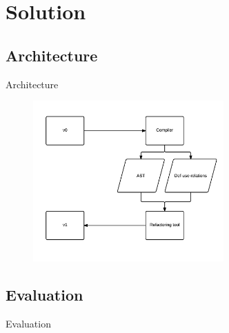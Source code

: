 \documentclass[xcolor=dvipsnames]{beamer}
\begin{document}
\section{Solution}
\subsection{Architecture}
\begin{frame}{Architecture}
\begin{figure}[htbp]
  \centering
  \includegraphics[width=0.65\textwidth]{img/arquitectura.png}
  \label{fig:label}
\end{figure}
\end{frame}


\subsection{Evaluation}
\begin{frame}{Evaluation}

\end{frame}
\end{document}
